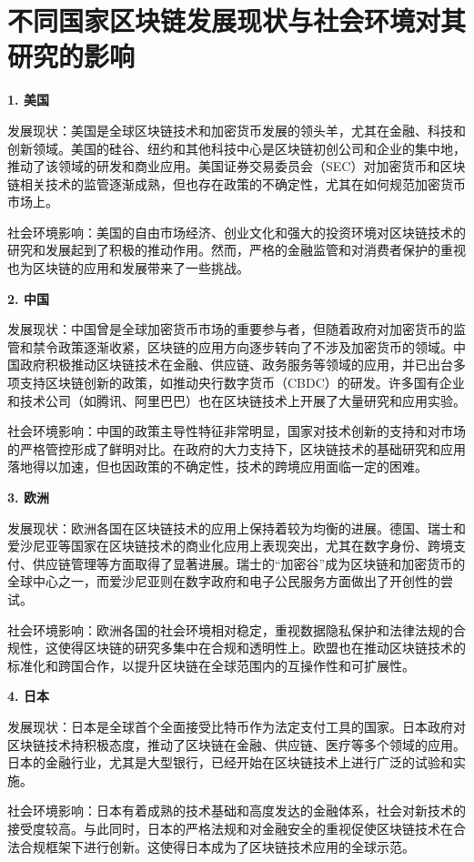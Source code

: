 \chapter{不同国家区块链发展现状与社会环境对其研究的影响}

\textbf{1. 美国}

发展现状：美国是全球区块链技术和加密货币发展的领头羊，尤其在金融、科技和创新领域。美国的硅谷、纽约和其他科技中心是区块链初创公司和企业的集中地，推动了该领域的研发和商业应用。美国证券交易委员会（SEC）对加密货币和区块链相关技术的监管逐渐成熟，但也存在政策的不确定性，尤其在如何规范加密货币市场上。

社会环境影响：美国的自由市场经济、创业文化和强大的投资环境对区块链技术的研究和发展起到了积极的推动作用。然而，严格的金融监管和对消费者保护的重视也为区块链的应用和发展带来了一些挑战。


\textbf{2. 中国}

发展现状：中国曾是全球加密货币市场的重要参与者，但随着政府对加密货币的监管和禁令政策逐渐收紧，区块链的应用方向逐步转向了不涉及加密货币的领域。中国政府积极推动区块链技术在金融、供应链、政务服务等领域的应用，并已出台多项支持区块链创新的政策，如推动央行数字货币（CBDC）的研发。许多国有企业和技术公司（如腾讯、阿里巴巴）也在区块链技术上开展了大量研究和应用实验。

社会环境影响：中国的政策主导性特征非常明显，国家对技术创新的支持和对市场的严格管控形成了鲜明对比。在政府的大力支持下，区块链技术的基础研究和应用落地得以加速，但也因政策的不确定性，技术的跨境应用面临一定的困难。

\textbf{3. 欧洲}

发展现状：欧洲各国在区块链技术的应用上保持着较为均衡的进展。德国、瑞士和爱沙尼亚等国家在区块链技术的商业化应用上表现突出，尤其在数字身份、跨境支付、供应链管理等方面取得了显著进展。瑞士的“加密谷”成为区块链和加密货币的全球中心之一，而爱沙尼亚则在数字政府和电子公民服务方面做出了开创性的尝试。

社会环境影响：欧洲各国的社会环境相对稳定，重视数据隐私保护和法律法规的合规性，这使得区块链的研究多集中在合规和透明性上。欧盟也在推动区块链技术的标准化和跨国合作，以提升区块链在全球范围内的互操作性和可扩展性。

\textbf{4. 日本}

发展现状：日本是全球首个全面接受比特币作为法定支付工具的国家。日本政府对区块链技术持积极态度，推动了区块链在金融、供应链、医疗等多个领域的应用。日本的金融行业，尤其是大型银行，已经开始在区块链技术上进行广泛的试验和实施。

社会环境影响：日本有着成熟的技术基础和高度发达的金融体系，社会对新技术的接受度较高。与此同时，日本的严格法规和对金融安全的重视促使区块链技术在合法合规框架下进行创新。这使得日本成为了区块链技术应用的全球示范。
